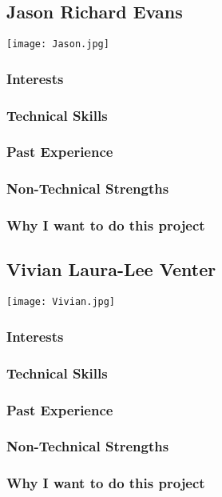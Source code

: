 
\subsection{Jason Richard Evans}
\texttt{[image: Jason.jpg]}

\subsubsection{Interests}
\subsubsection{Technical Skills}
\subsubsection{Past Experience}
\subsubsection{Non-Technical Strengths}
\subsubsection{Why I want to do this project}

\subsection{Vivian Laura-Lee Venter}
\texttt{[image: Vivian.jpg]}

\subsubsection{Interests}
\subsubsection{Technical Skills}
\subsubsection{Past Experience}
\subsubsection{Non-Technical Strengths}
\subsubsection{Why I want to do this project}
